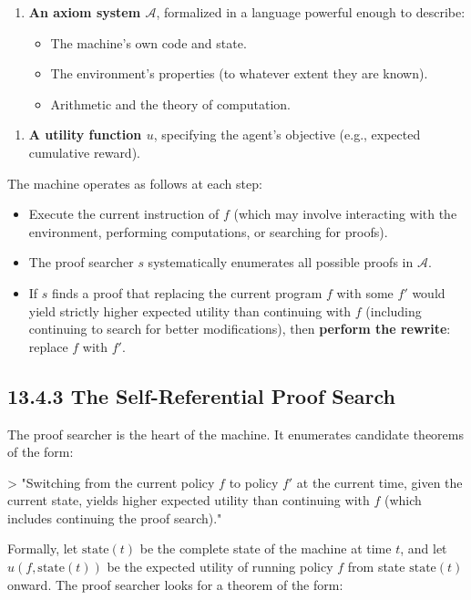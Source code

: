 \begin{enumerate}
  \item \textbf{An axiom system $\mathcal{A}$}, formalized in a language powerful enough to describe:
\begin{itemize}
  \item The machine's own code and state.
  \item The environment's properties (to whatever extent they are known).
  \item Arithmetic and the theory of computation.
\end{itemize}
\end{enumerate}

\begin{enumerate}
  \item \textbf{A utility function $u$}, specifying the agent's objective (e.g., expected cumulative reward).
\end{enumerate}

The machine operates as follows at each step:

\begin{itemize}
  \item Execute the current instruction of $f$ (which may involve interacting with the environment, performing computations, or searching for proofs).
  \item The proof searcher $s$ systematically enumerates all possible proofs in $\mathcal{A}$.
  \item If $s$ finds a proof that replacing the current program $f$ with some $f'$ would yield strictly higher expected utility than continuing with $f$ (including continuing to search for better modifications), then \textbf{perform the rewrite}: replace $f$ with $f'$.
\end{itemize}

\subsection{13.4.3 The Self-Referential Proof Search}

The proof searcher is the heart of the machine. It enumerates candidate theorems of the form:

> "Switching from the current policy $f$ to policy $f'$ at the current time, given the current state, yields higher expected utility than continuing with $f$ (which includes continuing the proof search)."

Formally, let $\text{state}(t)$ be the complete state of the machine at time $t$, and let $u(f, \text{state}(t))$ be the expected utility of running policy $f$ from state $\text{state}(t)$ onward. The proof searcher looks for a theorem of the form:

